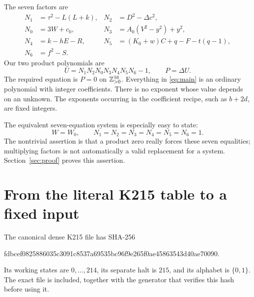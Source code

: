 \documentclass[11pt]{article}
\theoremstyle{remark}\newtheorem{remark}[theorem]{Remark}
\begin{document}
The seven factors are
\begin{align}
 N_1&=\tau^2-L(L+k), &N_2&=D^2-\Delta c^2,\label{eq:norm12}\\
 N_0&=3W+c_0, &N_3&=A_0(V^2-y^2)+y^2,\label{eq:norm03}\\
 N_4&=k-hE-R, &N_5&=(K_0+w)C+q-F-t(q-1),\label{eq:norm45}\\
 N_6&=f^2-S.\label{eq:norm6}
\end{align}
Our two product polynomials are
\begin{equation}\label{eq:main}
 \boxed{\quad
 U=N_1N_2N_0N_3N_4N_5N_6-1,
 \qquad P=\Delta U.
 \quad}
\end{equation}
The required equation is $P=0$ on $\mathbb Z_{>0}^{16}$. Everything in
\eqref{eq:main} is an ordinary polynomial with integer coefficients.
There is no exponent whose value depends on an unknown. The exponents
occurring in the coefficient recipe, such as $b+2d$, are fixed integers.

The equivalent seven-equation system is especially easy to state:
\begin{equation}\label{eq:system}
 \boxed{\quad W=W_0,\qquad N_1=N_2=N_3=N_4=N_5=N_6=1.\quad}
\end{equation}
The nontrivial assertion is that a product zero really forces these
seven equalities; multiplying factors is not automatically a valid
replacement for a system. Section~\ref{sec:proof} proves this assertion.

\section{From the literal K215 table to a fixed input}\label{sec:machine}

The canonical dense K215 file has SHA-256
\begin{center}\small\ttfamily
fdbcef0825886035c3091c8537a69535bc96f9e265f0ae45863543d40ae70090.
\end{center}
Its working states are $0,\ldots,214$, its separate halt is $215$, and
its alphabet is $\{0,1\}$. The exact file is included, together with
the generator that verifies this hash before using it.
\end{document}
